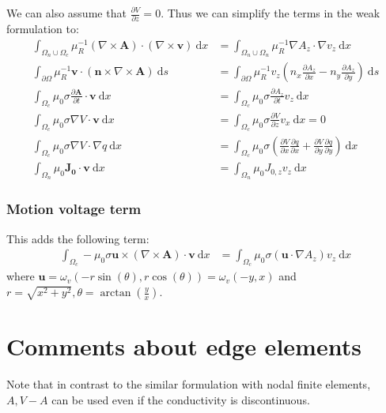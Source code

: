 \documentclass{article}
\newcommand{\curl}[1]{\nabla \times #1}
\newcommand{\mbf}[1]{\mathbf{#1}}
\newcommand{\ddn}[2]{\frac{\partial #1}{\partial #2}}
\newcommand{\dx}[0]{~\mathrm{d}x}
\newcommand{\ds}[0]{~\mathrm{d}s}
\newcommand{\pOmega}[0]{\partial\Omega}
\begin{document}
We can also assume that $\ddn{V}{z}=0$.
Thus we can simplify the terms in the weak formulation to:
\begin{subequations}
\begin{align}
    \int_{\Omega_n\cup\Omega_c}\mu_R^{-1}(\curl \mbf{A})\cdot(\curl \mbf{v})\dx & = \int_{\Omega_n\cup\Omega_n} \mu_R^{-1}\nabla A_z \cdot \nabla v_z \dx\\
    \int_{\pOmega}\mu_R^{-1} \mbf{v}\cdot (\mbf{n}\times\curl{\mbf{A}}) \ds &= \int_{\pOmega} \mu_R^{-1} v_z \left(n_x \ddn{A_z}{x} - n_y\ddn{A_z}{y}\right)\ds\\
    \int_{\Omega_c} \mu_0 \sigma \ddn{\mbf{A}}{t}\cdot \mbf{v} \dx &=
    \int_{\Omega_c} \mu_0 \sigma \ddn{A_z}{t}v_z \dx\\
    \int_{\Omega_c} \mu_0 \sigma \nabla V \cdot \mbf{v} \dx &=
    \int_{\Omega_c} \mu_0 \sigma \ddn{V}{z} v_x\dx = 0\\
    \int_{\Omega_c} \mu_0\sigma \nabla V \cdot \nabla q \dx &=
    \int_{\Omega_c} \mu_0\sigma \left(\ddn{V}{x}\ddn{q}{x} + \ddn{V}{y}\ddn{q}{y} \right)\dx\\
    \int_{\Omega_n} \mu_0 \mbf{J_0}\cdot \mbf{v} \dx &=
    \int_{\Omega_n} \mu_0 J_{0,z} v_z \dx
\end{align}
\end{subequations}

\subsubsection{Motion voltage term}
This adds the following term:
\begin{align*}
    \int_{\Omega_c} -\mu_0\sigma \mbf{u} \times (\curl{\mbf{A}})\cdot \mbf{v} \dx
    &=\int_{\Omega_c}\mu_0\sigma (\mbf{u}\cdot \nabla A_z)v_z \dx
\end{align*}
where $\mbf{u}=\omega_v(-r\sin(\theta), r\cos(\theta))=\omega_v(-y, x)$
and $r=\sqrt{x^2+y^2}, \theta = \arctan\left(\frac{y}{x}\right)$.

\section{Comments about edge elements}

Note that in contrast to the similar formulation with nodal finite
elements, $A, V-A$ can be used even if the conductivity is
discontinuous.
\end{document}

